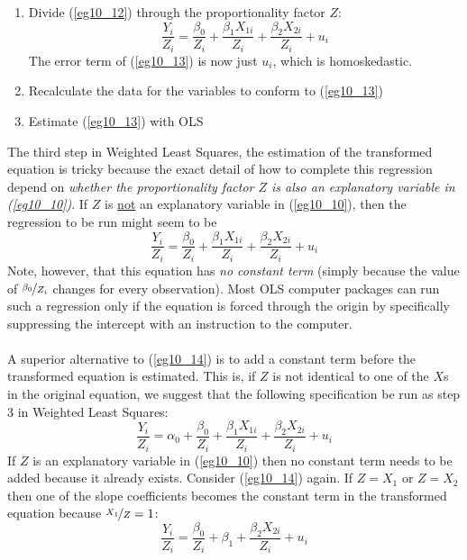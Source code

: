 \documentclass[11pt]{article}
\begin{document}
\begin{enumerate}
\item Divide (\ref{eg10_12}) through the proportionality factor $Z$:
\begin{equation}
\frac{Y_i}{Z_i} = \frac{\beta_0}{Z_i} +\frac{\beta_1X_{1i}}{Z_i} + \frac{\beta_2X_{2i}}{Z_i} + u_i \label{eg10_13}
\end{equation}
The error term of (\ref{eg10_13}) is now just $u_i$, which is homoskedastic.
\item Recalculate the data for the variables to conform to (\ref{eg10_13})
\item Estimate (\ref{eg10_13}) with OLS
\end{enumerate}
The third step in Weighted Least Squares, the estimation of the transformed equation is tricky because the exact detail of how to complete this regression depend on \textit{whether the proportionality factor $Z$ is also an explanatory variable in (\ref{eg10_10})}. If $Z$ is \underline{not} an explanatory variable in (\ref{eg10_10}), then the regression to be run might seem to be
\begin{equation}
\frac{Y_i}{Z_i} = \frac{\beta_0}{Z_i} +\frac{\beta_1X_{1i}}{Z_i} + \frac{\beta_2X_{2i}}{Z_i} + u_i \label{eg10_14}
\end{equation}
Note, however, that this equation has \textit{no constant term} (simply because the value of $\nicefrac{\beta_0}{Z_i}$ changes for every observation). Most OLS computer packages can run such a regression only if the equation is forced through the origin by specifically suppressing the intercept with an instruction to the computer.\\ \\
A superior alternative to (\ref{eg10_14}) is to add a constant term before the transformed equation is estimated. This is, if $Z$ is not identical to one of the $X$s in the original equation, we suggest that the following specification be run as step 3 in Weighted Least Squares:
\begin{equation}
\frac{Y_i}{Z_i} = \alpha_0 + \frac{\beta_0}{Z_i} +\frac{\beta_1X_{1i}}{Z_i} + \frac{\beta_2X_{2i}}{Z_i} + u_i \label{eg10_15}
\end{equation}
If $Z$ is an explanatory variable in (\ref{eg10_10}) then no constant term needs to be added because it already exists. Consider (\ref{eg10_14}) again. If $Z=X_1$ or $Z=X_2$ then one of the slope coefficients becomes the constant term in the transformed equation because $\nicefrac{X_1}{Z} = 1$:
\begin{equation}
\frac{Y_i}{Z_i} = \frac{\beta_0}{Z_i} + \beta_1 + \frac{\beta_2X_{2i}}{Z_i} + u_i \label{eg10_16}
\end{equation}
\end{document}
